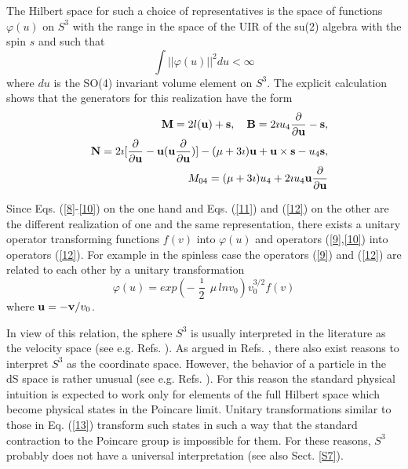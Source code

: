 \documentclass[a4paper,12pt]{article}%
\begin{document}
The Hilbert space for such a choice of representatives is 
the space of functions $\varphi (u)$ on $S^3$ 
with the range in the space of the UIR of the su(2) algebra 
with the spin $s$ and such that
\begin{equation}
\int\nolimits ||\varphi(u)||^2du <\infty
\label{11}
\end{equation}
where $du$ is the SO(4) invariant volume element on $S^3$.
The explicit calculation  shows  that  the  generators for  this
realization have the form
\begin{eqnarray}
&&{\bf M}=2l({\bf u})+{\bf s},\quad {\bf B}=2\imath u_4
\frac{\partial}{\partial {\bf u}}-{\bf s}, \nonumber\\
&& {\bf N}=2\imath [\frac{\partial}{\partial {\bf u}}-
{\bf u}({\bf u}\frac{\partial}{\partial {\bf u}})]
-(\mu +3\imath){\bf u}+{\bf u}\times {\bf s}-u_4{\bf s},\nonumber\\
&& M_{04}=(\mu +3\imath)u_4+2\imath u_4{\bf u}
\frac{\partial}{\partial {\bf u}}
\label{12}
\end{eqnarray}

Since Eqs. (\ref{8}-\ref{10}) on the one hand and
Eqs. (\ref{11}) and (\ref{12}) on  the
other  are  the  different  realization  of  one  
and   the   same
representation, there exists a unitary operator transforming
functions $f(v)$ into $\varphi (u)$ and operators 
(\ref{9},\ref{10}) into
operators (\ref{12}). For example in the spinless case the
operators (\ref{9}) and (\ref{12}) are related to each other
by a unitary transformation 
\begin{equation}
\varphi (u)=exp(-\frac{\imath}{2}\,\mu \,lnv_0)v_0^{3/2}f(v)
\label{13}
\end{equation}
where ${\bf u}=-{\bf v}/v_0$. 

In view of this relation, the
sphere $S^3$ is usually interpreted in the literature as the
velocity space (see e.g. Refs. \cite{Men,Dobrev,Moy,Mielke}). 
As argued
in Refs. \cite{lev1,lev1a,lev3}, there also exist reasons 
to interpret
$S^3$ as the coordinate space. However, the behavior of a particle
in the dS space is rather unusual (see e.g. Refs.
\cite{Men,Mielke,Narlikar}). For this reason the standard 
physical intuition
is expected to work only for elements of the full 
Hilbert space
which become physical states in the Poincare limit. 
Unitary transformations 
similar to those in Eq. (\ref{13}) transform such states in
such a way that the standard contraction to the 
Poincare group 
is impossible for them. For these reasons, $S^3$ probably 
does not have
a universal interpretation (see also Sect. \ref{S7}). 
\end{document}

